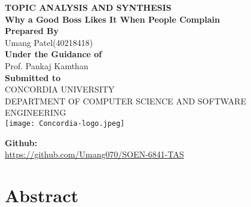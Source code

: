 \documentclass[a4paper,12pt]{report}
\begin{document}
\begin{titlepage}
   \begin{center}
       \vspace*{-8ex}
        \begin{figure}[h!]
  \centering
\end{figure}

       \textbf{\large TOPIC ANALYSIS AND SYNTHESIS }\\[0.3in]
        \textbf{\large Why a Good Boss Likes It When People Complain} \\ [0.3in]
        \textbf{\large Prepared By} \\[0.1in]
        \normal Umang Patel(40218418)\\[0.3in]
       

        \textbf{\large Under the Guidance of}\\[0.15in]
        \normal Prof. Pankaj Kamthan\\[0.4in]

        \textbf{\large Submitted to}\\[0.15in]
        \normal CONCORDIA UNIVERSITY\\[0.05in]
        \normal DEPARTMENT OF COMPUTER SCIENCE AND SOFTWARE ENGINEERING\\[0.2in]
        \texttt{[image: Concordia-logo.jpeg]}

       \vspace{1.0cm}
      
        \textbf{Github:}\\\url{https://github.com/Umang070/SOEN-6841-TAS}\\[0.2in]
    
       \vfill
   \end{center}
\end{titlepage}

\tableofcontents
\chapter {Abstract}
\end{document}

